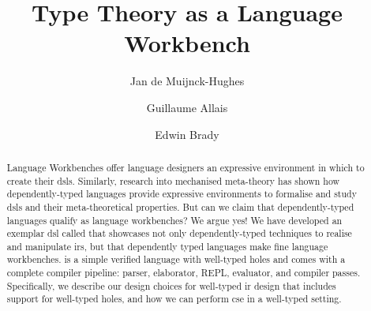\documentclass[%
draft, %
a4paper,
UKenglish,
cleveref,
autoref,
thm-restate,
pdfa
]{oasics-v2021}
\title{Type Theory as a Language Workbench} %
\author
{Jan {de Muijnck-Hughes}}
{University of Glasgow, UK}
{Jan.deMuijnck-Hughes@glasgow.ac.uk}
{https://orcid.org/0000-0003-2185-8543}
{} %
\author
{Guillaume Allais}
{University of St Andrews, UK}
{gxa1@st-andrews.ac.uk} %
{https://orcid.org/0000-0002-4091-657X} %
{} %
\author
{Edwin Brady}
{University of St Andrews, UK}
{ecb10@st-andrews.ac.uk} %
{} %
{} %
\begin{document}


\maketitle


\begin{abstract}
  Language Workbenches offer language designers an expressive environment in which to create their \acp*{dsl}.
  Similarly, research into mechanised meta-theory has shown how dependently-typed languages provide expressive environments to formalise and study \acsp*{dsl} and their meta-theoretical properties.
  But can we claim that dependently-typed languages qualify as language workbenches?
  We argue yes!
  We have developed an exemplar \acs*{dsl} called \Velo{} that showcases not only dependently-typed techniques to realise and manipulate \acp*{ir}, but that dependently typed languages make fine language workbenches.
  \Velo{} is a simple verified language with well-typed holes and comes with a complete compiler pipeline: parser, elaborator, REPL, evaluator, and compiler passes.
  Specifically, we describe our design choices for well-typed \acs*{ir} design that includes support for well-typed holes, and how we can perform \acf*{cse} in a well-typed setting.

%
%
%
%
\end{abstract}
\end{document}
